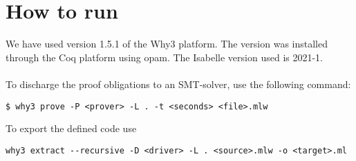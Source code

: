 \section{How to run}\label{run}
We have used version 1.5.1 of the Why3 platform. The version was installed through the Coq platform using opam.
The Isabelle version used is 2021-1.
\\~\\
To discharge the proof obligations to an SMT-solver, use the following command:

\begin{lstlisting}
$ why3 prove -P <prover> -L . -t <seconds> <file>.mlw
\end{lstlisting}

To export the defined code use

\begin{lstlisting}
why3 extract --recursive -D <driver> -L . <source>.mlw -o <target>.ml
\end{lstlisting}